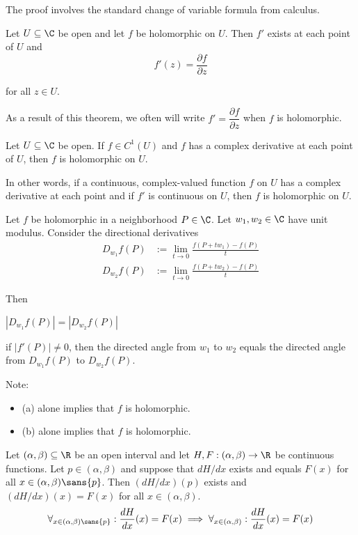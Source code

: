 The proof involves the standard change of variable formula from calculus.

\label{f75e43c}

Let $U\subseteq\C$ be open and let $f$ be holomorphic on $U$. Then $f'$ exists
at each point of $U$ and
$$
  f'(z)=\frac{\partial f}{\partial z}
$$

for all $z\in U$.

As a result of this theorem, we often will write $f'=\dfrac{\partial
f}{\partial z}$ when $f$ is holomorphic.

\label{d037b0f}

Let $U\subseteq\C$ be open. If $f\in C^1(U)$ and $f$ has a complex derivative
at each point of $U$, then $f$ is holomorphic on $U$.

In other words, if a continuous, complex-valued function $f$ on $U$ has a
complex derivative at each point and if $f'$ is continuous on $U$, then $f$ is
holomorphic on $U$.

\label{c41052e}

Let $f$ be holomorphic in a neighborhood $P\in\C$. Let $w_1,w_2\in\C$ have unit
modulus. Consider the directional derivatives
\begin{align*}
  D_{w_1}f(P) &:=\lim_{t\to0}\frac{f(P+tw_1)-f(P)}t \\
  D_{w_2}f(P) &:=\lim_{t\to0}\frac{f(P+tw_2)-f(P)}t
\end{align*}

Then
\begin{enumerata}
  \item $|D_{w_1}f(P)|=|D_{w_2}f(P)|$
  \item if $|f'(P)|\neq0$, then the directed angle from $w_1$ to $w_2$ equals
        the directed angle from $D_{w_1}f(P)$ to $D_{w_2}f(P)$.
\end{enumerata}

Note:
\begin{itemize}
  \item (a) alone implies that $f$ is holomorphic.
  \item (b) alone implies that $f$ is holomorphic.
\end{itemize}

\Lemma{}\label{f8abd8b}

Let $(\alpha,\beta)\subseteq\R$ be an open interval and let
$H,F:(\alpha,\beta)\to\R$ be continuous functions. Let $p\in(\alpha,\beta)$ and
suppose that $dH/dx$ exists and equals $F(x)$ for all
$x\in(\alpha,\beta)\sans{p}$. Then $(dH/dx)(p)$ exists and $(dH/dx)(x)=F(x)$
for all $x\in(\alpha,\beta)$.
$$
  \forall_{x\in(\alpha,\beta)\sans{p}}:\frac{dH}{dx}(x)=F(x)\implies
  \forall_{x\in(\alpha,\beta)}:\frac{dH}{dx}(x)=F(x)
$$

